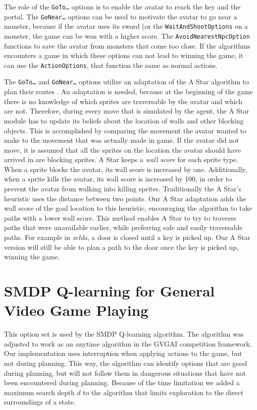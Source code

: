 The role of the \texttt{GoTo\ldots} options is to enable the avatar to reach the
key and the portal. The \texttt{GoNear\ldots} options can be used to motivate
the avatar to go near a monster, because if the avatar uses its sword (or the
\texttt{WaitAndShootOptions} on a monster, the game can be won with a higher
score. The \texttt{AvoidNearestNpcOption} functions to save the avatar from
monsters that come too close. If the algorithms encounters a game in which these
options can not lead to winning the game, it can use the \texttt{ActionOptions},
that function the same as normal actions.

The \texttt{GoTo\ldots} and \texttt{GoNear\ldots} options utilize an adaptation
of the A Star algorithm to plan their routes \cite{hart1968formal}. An adaptation is needed, because
at the beginning of the game there is no knowledge of which sprites are
traversable by the avatar and which are not. Therefore, during every move that
is simulated by the agent, the A Star module has to update its beliefs about the
location of walls and other blocking objects. This is accomplished by comparing
the movement the avatar wanted to make to the movement that was actually made in
game. If the avatar did not move, it is assumed that all the sprites on the
location the avatar should have arrived in are blocking sprites. A Star keeps a
\emph{wall score} for each sprite type. When a sprite blocks the avatar, its
wall score is increased by one. Additionally, when a sprite kills the avatar,
its wall score is increased by 100, in order to prevent the avatar from walking
into killing sprites.  Traditionally the A Star's heuristic uses the distance
between two points. Our A Star adaptation adds the wall score of the goal
location to this heuristic, encouraging the algorithm to take paths with a lower
wall score. This method enables A Star to try to traverse paths that were
unavailable earlier, while preferring safe and easily traversable paths. For
example in \textit{zelda}, a door is closed until a key is picked up. Our A Star
version will still be able to plan a path to the door once the key is picked up,
winning the game.


\section{SMDP Q-learning for General Video Game Playing}
\label{subsec:smdp-qlearning-gvgp}

This option set is used by the SMDP Q-learning algorithm. The algorithm was
adjusted to work as an anytime algorithm in the GVGAI competition framework.
Our implementation uses interruption when applying actions to the game, but not
during planning. This way, the algorithm can identify options that are good
during planning, but will not follow them in dangerous situations that have not
been encountered during planning. Because of the time limitation we added a
maximum search depth $d$ to the algorithm that limits exploration to the direct
surroundings of a state.

